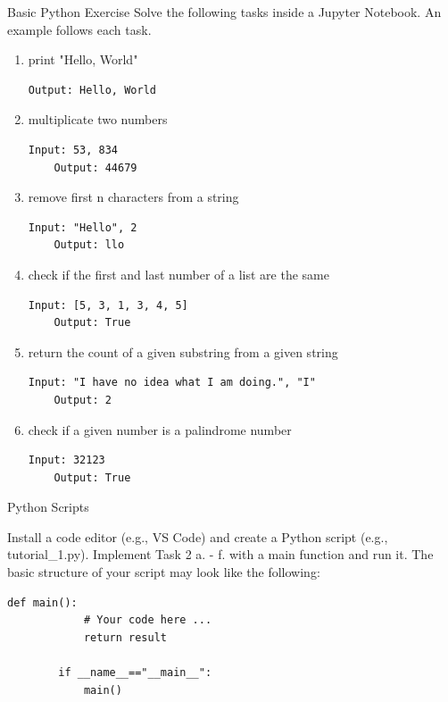 \documentclass[twoside]{article}
\begin{document}
\begin{task}{Basic Python Exercise}{}{}
Solve the following tasks inside a Jupyter Notebook. An example follows each task.
\begin{enumerate}
    \item print "Hello, World"
    \begin{lstlisting}[numbers=none]
    Output: Hello, World
    \end{lstlisting}
    
    \item multiplicate two numbers
    \begin{lstlisting}[numbers=none]
    Input: 53, 834
    Output: 44679
    \end{lstlisting}
    
    \item remove first n characters from a string
    \begin{lstlisting}[numbers=none]
    Input: "Hello", 2
    Output: llo
    \end{lstlisting}

    \clearpage

    \item check if the first and last number of a list are the same
    \begin{lstlisting}[numbers=none]
    Input: [5, 3, 1, 3, 4, 5]
    Output: True
    \end{lstlisting}
    
    
    \item return the count of a given substring from a given string
    \begin{lstlisting}[numbers=none]
    Input: "I have no idea what I am doing.", "I"
    Output: 2
    \end{lstlisting}
    
    \item check if a given number is a palindrome number
    \begin{lstlisting}[numbers=none]
    Input: 32123
    Output: True
    \end{lstlisting}
    
\end{enumerate}
\end{task}


\begin{task}{Python Scripts}{}{}

    Install a code editor (e.g., VS Code) and create a Python script (e.g., tutorial\_1.py). Implement Task 2 a. - f. with a main function and run it.
    The basic structure of your script may look like the following:
    
    \begin{lstlisting}[numbers=none]
        def main():
            # Your code here ...           
            return result

        if __name__=="__main__":
            main()
    \end{lstlisting}

\end{task}
\end{document}
